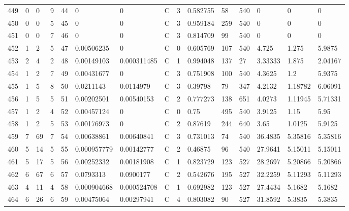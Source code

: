 \begin{latin}
\begin{longtable}{lllllllllllllll}
	449 & 0  & 0   & 9  & 44  & 0              & 0              & C & 3  & 0.582755 & 58   & 540  & 0       & 0       & 0       \\
	450 & 0  & 0   & 5  & 45  & 0              & 0              & C & 3  & 0.959184 & 259  & 540  & 0       & 0       & 0       \\
	451 & 0  & 0   & 7  & 46  & 0              & 0              & C & 3  & 0.814709 & 99   & 540  & 0       & 0       & 0       \\
	452 & 1  & 2   & 5  & 47  & 0.00506235     & 0              & C & 0  & 0.605769 & 107  & 540  & 4.725   & 1.275   & 5.9875  \\
	453 & 2  & 4   & 2  & 48  & 0.00149103     & 0.000311485    & C & 1  & 0.994048 & 137  & 27   & 3.33333 & 1.875   & 2.04167 \\
	454 & 1  & 2   & 7  & 49  & 0.00431677     & 0              & C & 3  & 0.751908 & 100  & 540  & 4.3625  & 1.2     & 5.9375  \\
	455 & 1  & 5   & 8  & 50  & 0.0211143      & 0.0114979      & C & 3  & 0.39798  & 79   & 347  & 4.2132  & 1.18782 & 6.06091 \\
	456 & 1  & 5   & 5  & 51  & 0.00202501     & 0.00540153     & C & 2  & 0.777273 & 138  & 651  & 4.0273  & 1.11945 & 5.71331 \\
	457 & 1  & 2   & 4  & 52  & 0.00457124     & 0              & C & 0  & 0.75     & 495  & 540  & 3.9125  & 1.15    & 5.95    \\
	458 & 1  & 2   & 5  & 53  & 0.00176973     & 0              & C & 2  & 0.87619  & 244  & 640  & 3.65    & 1.0125  & 5.9125  \\
	459 & 7  & 69  & 7  & 54  & 0.00638861     & 0.00640841     & C & 3  & 0.731013 & 74   & 540  & 36.4835 & 5.35816 & 5.35816 \\
	460 & 5  & 14  & 5  & 55  & 0.000957779    & 0.00142777     & C & 2  & 0.46875  & 96   & 540  & 27.9641 & 5.15011 & 5.15011 \\
	461 & 5  & 17  & 5  & 56  & 0.00252332     & 0.00181908     & C & 1  & 0.823729 & 123  & 527  & 28.2697 & 5.20866 & 5.20866 \\
	462 & 6  & 67  & 6  & 57  & 0.0793313      & 0.0900177      & C & 2  & 0.542676 & 195  & 527  & 32.2259 & 5.11293 & 5.11293 \\
	463 & 4  & 11  & 4  & 58  & 0.000904668    & 0.000524708    & C & 1  & 0.692982 & 123  & 527  & 27.4434 & 5.1682  & 5.1682  \\
	464 & 6  & 26  & 6  & 59  & 0.00475064     & 0.00297941     & C & 4  & 0.803082 & 90   & 527  & 31.8592 & 5.3835  & 5.3835  \\

\end{longtable}
\end{latin}
